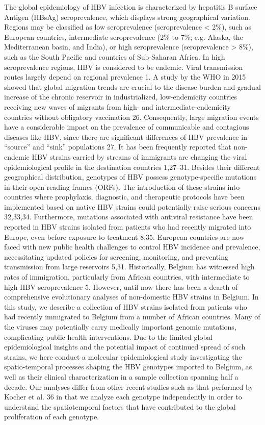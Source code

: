 The global epidemiology of HBV infection is characterized by hepatitis B surface Antigen (HBsAg) seroprevalence, which displays strong geographical variation. Regions may be classified as low seroprevalence (seroprevalence < 2\%), such as European countries, intermediate seroprevalence (2\% to 7\%; e.g. Alaska, the Mediterranean basin, and India), or high seroprevalence (seroprevalence > 8\%), such as the South Pacific and countries of Sub-Saharan Africa. In high seroprevalence regions, HBV is considered to be endemic. Viral transmission routes largely depend on regional prevalence 1. A study by the WHO in 2015 showed that global migration trends are crucial to the disease burden and gradual increase of the chronic reservoir in industrialized, low-endemicity countries receiving new waves of migrants from high- and intermediate-endemicity countries without obligatory vaccination 26. Consequently, large migration events have a considerable impact on the prevalence of communicable and contagious diseases like HBV, since there are significant differences of HBV prevalence in “source” and “sink” populations 27. It has been frequently reported that non-endemic HBV strains carried by streams of immigrants are changing the viral epidemiological profile in the destination countries 1,27–31. Besides their different geographical distribution, genotypes of HBV possess genotype-specific mutations in their open reading frames (ORFs). The introduction of these strains into countries where prophylaxis, diagnostic, and therapeutic protocols have been implemented based on native HBV strains could potentially raise serious concerns 32,33,34. Furthermore, mutations associated with antiviral resistance have been reported in HBV strains isolated from patients who had recently migrated into Europe, even before exposure to treatment 8,35. European countries are now faced with new public health challenges to control HBV incidence and prevalence, necessitating updated policies for screening, monitoring, and preventing transmission from large reservoirs 5,31. 
Historically, Belgium has witnessed high rates of immigration, particularly from African countries, with intermediate to high HBV seroprevalence 5. However, until now there has been a dearth of comprehensive evolutionary analyses of non-domestic HBV strains in Belgium. In this study, we describe a collection of HBV strains isolated from patients who had recently immigrated to Belgium from a number of African countries. Many of the viruses may potentially carry medically important genomic mutations, complicating public health interventions. Due to the limited global epidemiological insights and the potential impact of continued spread of such strains, we here conduct a molecular epidemiological study investigating the spatio-temporal processes shaping the HBV genotypes imported to Belgium, as well as their clinical characterization in a sample collection spanning half a decade. Our analyses differ from other recent studies such as that performed by Kocher et al. 36 in that we analyze each genotype independently in order to understand the spatiotemporal factors that have contributed to the global proliferation of each genotype.

